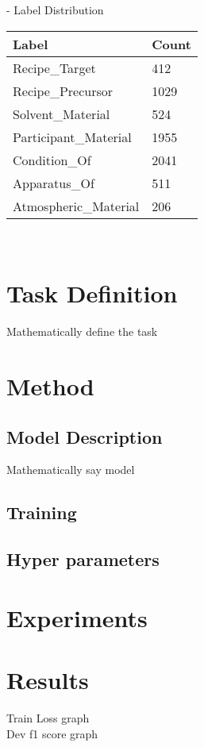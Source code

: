 \documentclass[11pt]{article}
\begin{document}
- Label Distribution \\
\begin{tabu} to 0.8\textwidth { | X[l] | X[c] | }
 \hline
 \textbf{Label} & \textbf{Count}\\
 \hline
 Recipe\_Target  & 412\\
\hline
Recipe\_Precursor  & 1029\\
\hline
Solvent\_Material  & 524\\
\hline
Participant\_Material  & 1955\\
\hline
Condition\_Of  & 2041\\
\hline
Apparatus\_Of  & 511\\
\hline
Atmospheric\_Material  & 206\\
\hline
\end{tabu} \\


\section{Task Definition}
Mathematically define the task

\section{Method}
\subsection{Model Description}
Mathematically say model

\subsection{Training}
\subsection{Hyper parameters}

\section{Experiments}

\section{Results}

Train Loss graph \\

Dev f1 score graph \\
\end{document}
